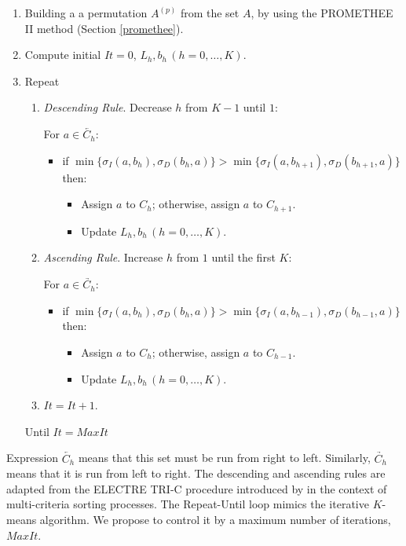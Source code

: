 \documentclass[]{elsarticle}
\theoremstyle{definition}
\begin{document}
\begin{enumerate}
\item
Building a a permutation $A^{(p)}$ from the set $A$, by using the PROMETHEE II method (Section \ref{promethee}).
\item
Compute initial $It=0$, $L_h, b_h \, (h=0,\ldots,K)$.
\item
Repeat 
\begin{enumerate}   
\item
\emph{Descending Rule}. Decrease $h$ from $K-1$ until $1$:

For $a\in \underleftarrow{C_h}$:

\begin{itemize}
\item
if $\min\{\sigma_I(a,b_h),\sigma_D(b_h,a)\} > \min\{\sigma_I(a,b_{h+1}),\sigma_D(b_{h+1},a)\}$ then:

\begin{itemize}
\item
Assign $a$ to $C_h$; otherwise, assign $a$ to $C_{h+1}$.

\item
Update $L_h, b_h \, (h=0,\ldots,K)$.
\end{itemize}
\end{itemize}


\item
\emph{Ascending Rule}. Increase $h$ from $1$ until the first $K$:

For $a\in \underrightarrow{C_h}$:

\begin{itemize}
\item
if $\min\{\sigma_I(a,b_h),\sigma_D(b_h,a)\} > \min\{\sigma_I(a,b_{h-1}),\sigma_D(b_{h-1},a)\}$ then:

\begin{itemize}
\item
Assign $a$ to $C_h$; otherwise, assign $a$ to $C_{h-1}$.

\item
Update $L_h, b_h \, (h=0,\ldots,K)$.
\end{itemize}
\end{itemize}

\item
$It=It+1$.

\end{enumerate}


Until $It = MaxIt$
\end{enumerate}


Expression $\underleftarrow{C_h}$ means that this set must be run from right to left. Similarly,  $\underrightarrow{C_h}$ means that it is run from left to right.  The descending and ascending rules are adapted from the ELECTRE TRI-C procedure introduced by \cite{almeida2008} in the context of multi-criteria sorting processes. The Repeat-Until loop mimics the iterative $K$-means algorithm. We propose to control it by a maximum number of iterations, $MaxIt$. 
\end{document}
